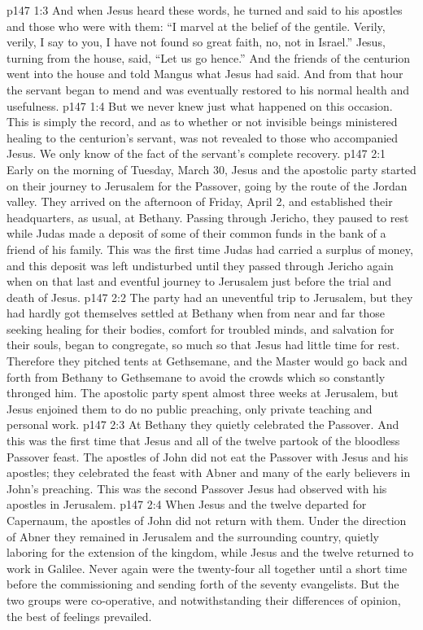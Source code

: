 \vs p147 1:3 And when Jesus heard these words, he turned and said to his apostles and those who were with them: \textcolor{ubdarkred}{“I marvel at the belief of the gentile. Verily, verily, I say to you, I have not found so great faith, no, not in Israel.”} Jesus, turning from the house, said, \textcolor{ubdarkred}{“Let us go hence.”} And the friends of the centurion went into the house and told Mangus what Jesus had said. And from that hour the servant began to mend and was eventually restored to his normal health and usefulness.
\vs p147 1:4 But we never knew just what happened on this occasion. This is simply the record, and as to whether or not invisible beings ministered healing to the centurion’s servant, was not revealed to those who accompanied Jesus. We only know of the fact of the servant’s complete recovery.
\vs p147 2:1 Early on the morning of Tuesday, March 30, Jesus and the apostolic party started on their journey to Jerusalem for the Passover, going by the route of the Jordan valley. They arrived on the afternoon of Friday, April 2, and established their headquarters, as usual, at Bethany. Passing through Jericho, they paused to rest while Judas made a deposit of some of their common funds in the bank of a friend of his family. This was the first time Judas had carried a surplus of money, and this deposit was left undisturbed until they passed through Jericho again when on that last and eventful journey to Jerusalem just before the trial and death of Jesus.
\vs p147 2:2 The party had an uneventful trip to Jerusalem, but they had hardly got themselves settled at Bethany when from near and far those seeking healing for their bodies, comfort for troubled minds, and salvation for their souls, began to congregate, so much so that Jesus had little time for rest. Therefore they pitched tents at Gethsemane, and the Master would go back and forth from Bethany to Gethsemane to avoid the crowds which so constantly thronged him. The apostolic party spent almost three weeks at Jerusalem, but Jesus enjoined them to do no public preaching, only private teaching and personal work.
\vs p147 2:3 At Bethany they quietly celebrated the Passover. And this was the first time that Jesus and all of the twelve partook of the bloodless Passover feast. The apostles of John did not eat the Passover with Jesus and his apostles; they celebrated the feast with Abner and many of the early believers in John’s preaching. This was the second Passover Jesus had observed with his apostles in Jerusalem.
\vs p147 2:4 When Jesus and the twelve departed for Capernaum, the apostles of John did not return with them. Under the direction of Abner they remained in Jerusalem and the surrounding country, quietly laboring for the extension of the kingdom, while Jesus and the twelve returned to work in Galilee. Never again were the twenty\hyp{}four all together until a short time before the commissioning and sending forth of the seventy evangelists. But the two groups were co\hyp{}operative, and notwithstanding their differences of opinion, the best of feelings prevailed.
